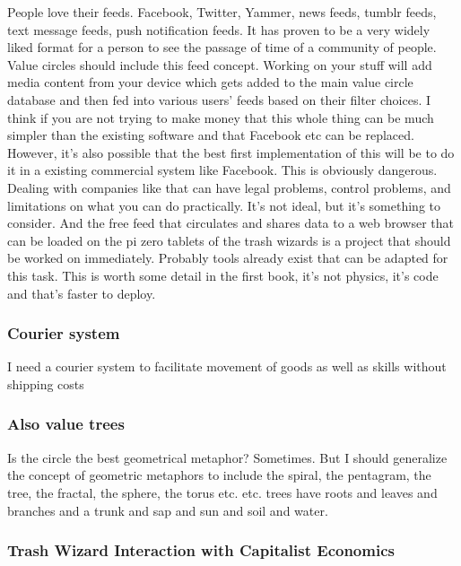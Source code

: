 People love their feeds. Facebook, Twitter, Yammer, news feeds, tumblr
feeds, text message feeds, push notification feeds. It has proven to be
a very widely liked format for a person to see the passage of time of a
community of people. Value circles should include this feed concept.
Working on your stuff will add media content from your device which gets
added to the main value circle database and then fed into various users'
feeds based on their filter choices. I think if you are not trying to
make money that this whole thing can be much simpler than the existing
software and that Facebook etc can be replaced. However, it's also
possible that the best first implementation of this will be to do it in
a existing commercial system like Facebook. This is obviously dangerous.
Dealing with companies like that can have legal problems, control
problems, and limitations on what you can do practically. It's not
ideal, but it's something to consider. And the free feed that circulates
and shares data to a web browser that can be loaded on the pi zero
tablets of the trash wizards is a project that should be worked on
immediately. Probably tools already exist that can be adapted for this
task. This is worth some detail in the first book, it's not physics,
it's code and that's faster to deploy.

\subsubsection{Courier system}\label{courier-system}

I need a courier system to facilitate movement of goods as well as
skills without shipping costs

\subsubsection{Also value trees}\label{also-value-trees}

Is the circle the best geometrical metaphor? Sometimes. But I should
generalize the concept of geometric metaphors to include the spiral, the
pentagram, the tree, the fractal, the sphere, the torus etc. etc. trees
have roots and leaves and branches and a trunk and sap and sun and soil
and water.

\subsubsection{Trash Wizard Interaction with Capitalist
Economics}\label{trash-wizard-interaction-with-capitalist-economics}

